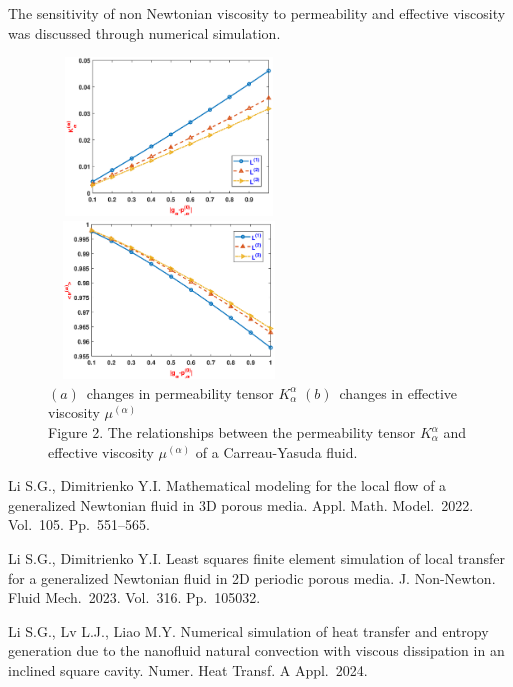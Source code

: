 \documentclass[12pt]{llncs}
\begin{document}
The sensitivity of non Newtonian viscosity to permeability and effective viscosity was discussed through numerical simulation.
\begin{figure}[htp]
\centering
\includegraphics[width=6.4cm,height=4.2cm]{2_1.eps}
\includegraphics[width=6.4cm,height=4.2cm]{2_2.eps}\\
$(a)$\ changes in permeability tensor $K_{\alpha}^{\alpha}$\quad\quad\quad
$(b)$\ changes in effective viscosity $\mu^{(\alpha)}$\\
\small{Figure 2. The relationships between the permeability tensor $K_{\alpha}^{\alpha}$
and effective viscosity $\mu^{(\alpha)}$  of a Carreau-Yasuda fluid.}
\end{figure}


\begin{thebibliography}{9} %
 Li S.G., Dimitrienko Y.I.
    Mathematical modeling for the local flow of a generalized Newtonian fluid in 3D porous media.
    Appl. Math. Model.~2022. Vol.~105. Pp.~551--565. %

 Li S.G., Dimitrienko Y.I.
    Least squares finite element simulation of local transfer for a generalized Newtonian fluid in 2D periodic porous media.
    J. Non-Newton. Fluid Mech.~2023. Vol.~316. Pp.~105032. %

 Li S.G., Lv L.J., Liao M.Y. Numerical simulation of heat transfer and entropy generation due to the nanofluid natural convection with viscous dissipation in an inclined square cavity. Numer. Heat Transf. A Appl.~2024. %
\end{thebibliography}
\end{document}
